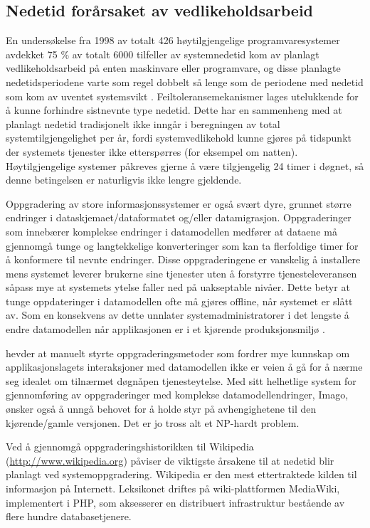 \subsection{Nedetid forårsaket av vedlikeholdsarbeid}

En undersøkelse fra 1998 av totalt 426 høytilgjengelige programvaresystemer avdekket 75 \% av totalt 6000 tilfeller av systemnedetid kom av planlagt vedlikeholdsarbeid på enten maskinvare eller programvare, og disse planlagte nedetidsperiodene varte som regel dobbelt så lenge som de periodene med nedetid som kom av uventet systemsvikt \citep{lowell2004, dumitras2009nodowntime}. Feiltoleransemekanismer lages utelukkende for å kunne forhindre sistnevnte type nedetid. Dette har en sammenheng med at planlagt nedetid tradisjonelt ikke inngår i beregningen av total systemtilgjengelighet per år, fordi systemvedlikehold kunne gjøres på tidspunkt der systemets tjenester ikke etterspørres (for eksempel om natten). Høytilgjengelige systemer påkreves gjerne å være tilgjengelig 24 timer i døgnet, så denne betingelsen er naturligvis ikke lengre gjeldende.

Oppgradering av store informasjonssystemer er også svært dyre, grunnet større endringer i dataskjemaet/dataformatet og/eller datamigrasjon. Oppgraderinger som innebærer komplekse endringer i datamodellen medfører at dataene må gjennomgå tunge og langtekkelige konverteringer som kan ta flerfoldige timer for å konformere til nevnte endringer. Disse oppgraderingene er vanskelig å installere mens systemet leverer brukerne sine tjenester uten å forstyrre tjenesteleveransen såpass mye at systemets ytelse faller ned på uakseptable nivåer. Dette betyr at tunge oppdateringer i datamodellen ofte må gjøres offline, når systemet er slått av. Som en konsekvens av dette unnlater systemadministratorer i det lengste å endre datamodellen når applikasjonen er i et kjørende produksjonsmiljø \citep{dumitras2009nodowntime}.

\cite{dumitras2009nodowntime} hevder at manuelt styrte oppgraderingsmetoder som fordrer mye kunnskap om applikasjonslagets interaksjoner med datamodellen ikke er veien å gå for å nærme seg idealet om tilnærmet døgnåpen tjenesteytelse. Med sitt helhetlige system for gjennomføring av oppgraderinger med komplekse datamodellendringer, Imago, ønsker \cite{dumitras2009nodowntime} også å unngå behovet for å holde styr på avhengighetene til den kjørende/gamle versjonen. Det er jo tross alt et NP-hardt problem.

Ved å gjennomgå oppgraderingshistorikken til Wikipedia (\url{http://www.wikipedia.org}) påviser \cite{dumitras2009nodowntime} de viktigste årsakene til at nedetid blir planlagt ved systemoppgradering. Wikipedia er den mest ettertraktede kilden til informasjon på Internett. Leksikonet driftes på wiki-plattformen MediaWiki, implementert i PHP, som aksesserer en distribuert infrastruktur bestående av flere hundre databasetjenere.

